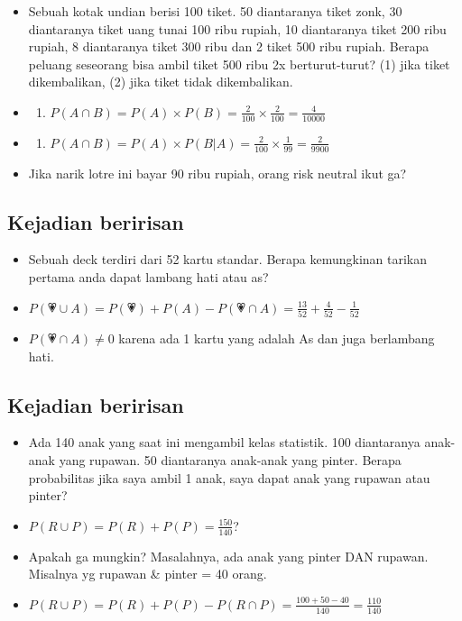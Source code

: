 \documentclass[
  letterpaper,
  DIV=11,
  numbers=noendperiod]{scrartcl}
\providecommand{\tightlist}{%
  \setlength{\itemsep}{0pt}\setlength{\parskip}{0pt}}\usepackage{longtable,booktabs,array}
\begin{document}
\begin{itemize}
\item
  Sebuah kotak undian berisi 100 tiket. 50 diantaranya tiket zonk, 30
  diantaranya tiket uang tunai 100 ribu rupiah, 10 diantaranya tiket 200
  ribu rupiah, 8 diantaranya tiket 300 ribu dan 2 tiket 500 ribu rupiah.
  Berapa peluang seseorang bisa ambil tiket 500 ribu 2x berturut-turut?
  (1) jika tiket dikembalikan, (2) jika tiket tidak dikembalikan.
\item
  \begin{enumerate}
  \def\labelenumi{(\arabic{enumi})}
  \tightlist
  \item
    \(P(A \cap B)=P(A) \times P(B)= \frac{2}{100} \times \frac{2}{100} = \frac{4}{10000}\)
  \end{enumerate}
\item
  \begin{enumerate}
  \def\labelenumi{(\arabic{enumi})}
  \setcounter{enumi}{1}
  \tightlist
  \item
    \(P(A \cap B)=P(A) \times P(B|A)= \frac{2}{100} \times \frac{1}{99} = \frac{2}{9900}\)
  \end{enumerate}
\item
  Jika narik lotre ini bayar 90 ribu rupiah, orang risk neutral ikut ga?
\end{itemize}

\subsection{Kejadian beririsan}\label{kejadian-beririsan}

\begin{itemize}
\item
  Sebuah deck terdiri dari 52 kartu standar. Berapa kemungkinan tarikan
  pertama anda dapat lambang hati atau as?
\item
  \(P(💗 \cup A)=P(💗)+P(A)-P(💗 \cap A)=\frac{13}{52}+\frac{4}{52}-\frac{1}{52}\)
\item
  \(P(💗 \cap A) \neq 0\) karena ada 1 kartu yang adalah As dan juga
  berlambang hati.
\end{itemize}

\subsection{Kejadian beririsan}\label{kejadian-beririsan-1}

\begin{itemize}
\item
  Ada 140 anak yang saat ini mengambil kelas statistik. 100 diantaranya
  anak-anak yang rupawan. 50 diantaranya anak-anak yang pinter. Berapa
  probabilitas jika saya ambil 1 anak, saya dapat anak yang rupawan atau
  pinter?
\item
  \(P(R \cup P)=P(R)+P(P)=\frac{150}{140}\)?
\item
  Apakah ga mungkin? Masalahnya, ada anak yang pinter DAN rupawan.
  Misalnya yg rupawan \& pinter = 40 orang.
\item
  \(P(R \cup P)=P(R)+P(P)-P(R\cap P)=\frac{100+50-40}{140}=\frac{110}{140}\)
\end{itemize}
\end{document}
